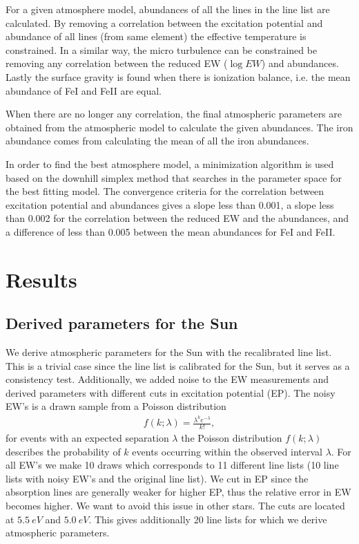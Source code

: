 \documentclass{aa}
\begin{document}
For a given atmosphere model, abundances of all the lines in the line
list are calculated. By removing a correlation between the excitation
potential and abundance of all lines (from same element) the effective
temperature is constrained. In a similar way, the micro turbulence can
be constrained be removing any correlation between the reduced EW ($\log
EW$) and abundances. Lastly the surface gravity is found when there is
ionization balance, i.e. the mean abundance of FeI and FeII are equal.

When there are no longer any correlation, the final atmospheric
parameters are obtained from the atmospheric model to calculate the
given abundances. The iron abundance comes from calculating the mean of
all the iron abundances.

In order to find the best atmosphere model, a minimization algorithm
is used based on the downhill simplex method \citep{press1992} that
searches in the parameter space for the best fitting model. The
convergence criteria for the correlation between excitation potential
and abundances gives a slope less than 0.001, a slope less than 0.002
for the correlation between the reduced EW and the abundances, and a
difference of less than 0.005 between the mean abundances for FeI and
FeII.







\section{Results}
\label{sec:results}



\subsection{Derived parameters for the Sun}
\label{sec:derived_parameters_of_the_sun}

We derive atmospheric parameters for the Sun with the recalibrated line
list. This is a trivial case since the line list is calibrated for the
Sun, but it serves as a consistency test. Additionally, we added noise
to the EW measurements and derived parameters with different cuts in
excitation potential (EP). The noisy EW's is a drawn sample from a
Poisson distribution \begin{align} f(k; \lambda) = \frac{\lambda^k
e^{-\lambda}}{k!}, \end{align} for events with an expected separation
$\lambda$ the Poisson distribution $f(k; \lambda)$ describes the
probability of $k$ events occurring within the observed interval
$\lambda$. For all EW's we make 10 draws which corresponds to 11
different line lists (10 line lists with noisy EW's and the original
line list). We cut in EP since the absorption lines are generally weaker
for higher EP, thus the relative error in EW becomes higher. We want to
avoid this issue in other stars. The cuts are located at $\SI{5.5}{eV}$
and $\SI{5.0}{eV}$. This gives additionally 20 line lists for which we
derive atmospheric parameters.
\end{document}
